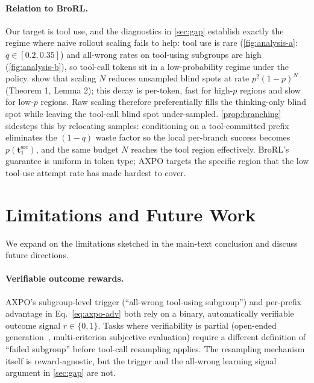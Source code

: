 \documentclass{llmxive}
\providecommand{\bm}[1]{\boldsymbol{#1}}
\providecommand{\toolresample}{tool-call resampling\xspace}
\providecommand{\vt}{{\bm{t}}}
\begin{document}
\paragraph{Relation to BroRL.}
Our target is tool use, and the diagnostics in \autoref{sec:gap} establish exactly the regime where naive rollout scaling fails to help: tool use is rare (\autoref{fig:analysis-a}: $q \in [0.2, 0.35]$) and all-wrong rates on tool-using subgroups are high (\autoref{fig:analysis-b}), so tool-call tokens sit in a low-probability regime under the policy. \citet{brorl} show that scaling $N$ reduces unsampled blind spots at rate $p^2(1-p)^N$ (Theorem 1, Lemma 2); this decay is per-token, fast for high-$p$ regions and slow for low-$p$ regions. Raw scaling therefore preferentially fills the thinking-only blind spot while leaving the tool-call blind spot under-sampled. \autoref{prop:branching} sidesteps this by relocating samples: conditioning on a tool-committed prefix eliminates the $(1-q)$ waste factor so the local per-branch success becomes $p(\vt_1^{\text{src}})$, and the same budget $N$ reaches the tool region effectively. BroRL's guarantee is uniform in token type; AXPO targets the specific region that the low tool-use attempt rate has made hardest to cover.

\section{Limitations and Future Work}
\label{app:limitations}

We expand on the limitations sketched in the main-text conclusion and discuss future directions.

\paragraph{Verifiable outcome rewards.}
AXPO's subgroup-level trigger (``all-wrong tool-using subgroup'') and per-prefix advantage in Eq.~\ref{eq:axpo-adv} both rely on a binary, automatically verifiable outcome signal $r \in \{0,1\}$. Tasks where verifiability is partial (open-ended generation~\citep{NEURIPS2025_e5849736, lee2025maskingteacherreinforcingstudent}, multi-criterion subjective evaluation) require a different definition of ``failed subgroup'' before \toolresample applies. The resampling mechanism itself is reward-agnostic, but the trigger and the all-wrong learning signal argument in \autoref{sec:gap} are not.
\end{document}
